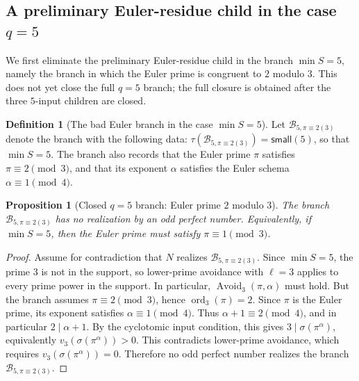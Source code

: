 \documentclass[11pt]{article}
\newtheorem{proposition}[theorem]{Proposition}
\theoremstyle{definition}
\newtheorem{definition}[theorem]{Definition}
\theoremstyle{remark}
\DeclareMathOperator{\ord}{ord}
\begin{document}
\begingroup
\setlength{\abovedisplayskip}{6pt plus 2pt minus 2pt}
\setlength{\belowdisplayskip}{6pt plus 2pt minus 2pt}
\setlength{\abovedisplayshortskip}{3pt plus 1pt minus 1pt}
\setlength{\belowdisplayshortskip}{4pt plus 1pt minus 1pt}
\subsection{A preliminary Euler-residue child in the case $q=5$}

We first eliminate the preliminary Euler-residue child in the branch
\(\min S=5\), namely the branch in which the Euler prime is congruent to
\(2\) modulo \(3\).
This does not yet close the full \(q=5\) branch; the full closure is obtained
after the three \(5\)-input children are closed.

\begin{definition}[The bad Euler branch in the case $\min S=5$]
Let $\mathcal B_{5,\pi\equiv 2(3)}$ denote the branch with the following data:
\(\tau(\mathcal B_{5,\pi\equiv 2(3)})=\mathsf{small}(5)\), so that
\(\min S=5\).  The branch also records that the Euler prime \(\pi\) satisfies
\(\pi\equiv2\pmod3\), and that its exponent \(\alpha\) satisfies the Euler
schema \(\alpha\equiv1\pmod4\).
\end{definition}

\begin{proposition}[Closed $q=5$ branch: Euler prime $2$ modulo $3$]
\label{prop:q5-euler-2mod3-empty}
The branch \(\mathcal B_{5,\pi\equiv 2(3)}\) has no realization by an odd
perfect number.  Equivalently, if \(\min S=5\), then the Euler prime must
satisfy \(\pi\equiv1\pmod3\).
\end{proposition}

\begin{proof}
Assume for contradiction that \(N\) realizes
\(\mathcal B_{5,\pi\equiv 2(3)}\).  Since \(\min S=5\), the prime \(3\) is
not in the support, so lower-prime avoidance with \(\ell=3\) applies to every
prime power in the support.  In particular,
\(\operatorname{Avoid}_3(\pi,\alpha)\) must hold.  But the branch assumes
\(\pi\equiv2\pmod3\), hence \(\ord_3(\pi)=2\).  Since \(\pi\) is the Euler
prime, its exponent satisfies \(\alpha\equiv1\pmod4\).  Thus
\(\alpha+1\equiv2\pmod4\), and in particular \(2\mid\alpha+1\).  By the
cyclotomic input condition, this gives \(3\mid\sigma(\pi^\alpha)\), equivalently
\(v_3(\sigma(\pi^\alpha))>0\).  This contradicts lower-prime avoidance, which
requires \(v_3(\sigma(\pi^\alpha))=0\).
Therefore no odd perfect number realizes the branch
$\mathcal B_{5,\pi\equiv 2(3)}$.
\end{proof}
\end{document}
